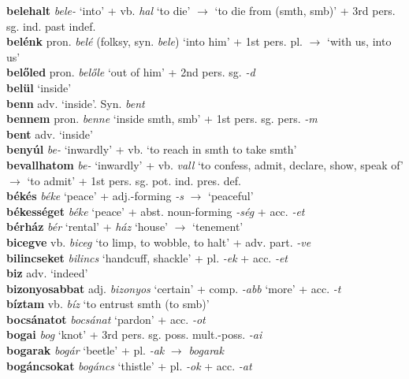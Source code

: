 \documentclass[11pt]{article}
\begin{document}
\textbf{belehalt} \emph{bele-} `into' + vb. \emph{hal} `to
die' $\rightarrow$ `to die from (smth, smb)' + 3rd pers. sg. ind. past
indef. \\
\textbf{belénk} pron. \emph{belé} (folksy, syn. \emph{bele}) `into him' + 1st
pers. pl. $\rightarrow$ `with us, into us' \\
\textbf{belőled} pron. \emph{belőle} `out of him' + 2nd
pers. sg. \emph{-d} \\
\textbf{belül} `inside' \\
\textbf{benn} adv. `inside'. Syn. \emph{bent} \\
\textbf{bennem} pron. \emph{benne} `inside smth, smb' + 1st
pers. sg. pers. \emph{-m} \\
\textbf{bent} adv. `inside' \\
\textbf{benyúl} \emph{be-} `inwardly' + vb. `to reach in
smth to take smth' \\
\textbf{bevallhatom} \emph{be-} `inwardly' + vb. \emph{vall} `to confess, admit, declare, show,
speak of' $\rightarrow$ `to admit' + 1st
pers. sg. pot. ind. pres. def. \\
\textbf{békés} \emph{béke} `peace' + adj.\hyp{}forming \emph{-s}
$\rightarrow$ `peaceful' \\
\textbf{békességet} \emph{béke} `peace' + abst. noun\hyp{}forming
  \emph{-ség} + acc. \emph{-et} \\
\textbf{bérház} \emph{bér} `rental' + \emph{ház} `house' $\rightarrow$
`tenement' \\
\textbf{bicegve} vb. \emph{biceg} `to limp, to wobble, to halt' +
adv. part. \emph{-ve} \\
\textbf{bilincseket} \emph{bilincs} `handcuff, shackle' +
pl. \emph{-ek} + acc. \emph{-et} \\
\textbf{biz} adv. `indeed' \\
\textbf{bizonyosabbat} adj. \emph{bizonyos} `certain' +
comp. \emph{-abb} `more' + acc. \emph{-t} \\
\textbf{bíztam} vb. \emph{bíz} `to entrust smth (to smb)' \\
\textbf{bocsánatot} \emph{bocsánat} `pardon' + acc. \emph{-ot} \\
\textbf{bogai} \emph{bog} `knot' + 3rd
pers. sg. poss. mult.\hyp{}poss. \emph{-ai} \\
\textbf{bogarak} \emph{bogár} `beetle' + pl. \emph{-ak}
  $\rightarrow$ \emph{bogarak} \\
\textbf{bogáncsokat} \emph{bogáncs} `thistle' + pl. \emph{-ok} +
acc. \emph{-at} \\
\end{document}
